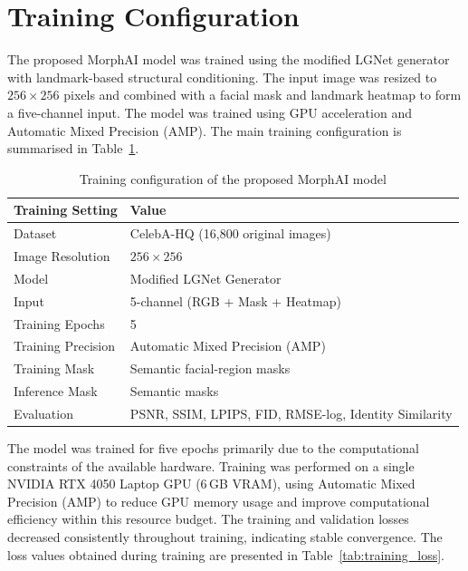 \section{Training Configuration}
The proposed MorphAI model was trained using the modified LGNet generator
with landmark-based structural conditioning. The input image was resized
to $256 \times 256$ pixels and combined with a facial mask and landmark
heatmap to form a five-channel input. The model was trained using GPU
acceleration and Automatic Mixed Precision (AMP). The main training
configuration is summarised in Table~\ref{tab:training_config}.
\begin{table}[H]
\centering
\renewcommand{\arraystretch}{1.3}
\begin{tabular}{|l|l|}
\hline
\textbf{Training Setting} & \textbf{Value} \\ \hline
Dataset & CelebA-HQ (16,800 original images) \\ \hline
Image Resolution & $256 \times 256$ \\ \hline
Model & Modified LGNet Generator \\ \hline
Input & 5-channel (RGB + Mask + Heatmap) \\ \hline
Training Epochs & 5 \\ \hline
Training Precision & Automatic Mixed Precision (AMP) \\ \hline
Training Mask & Semantic facial-region masks \\ \hline
Inference Mask & Semantic masks \\ \hline
Evaluation & PSNR, SSIM, LPIPS, FID, RMSE-log, Identity Similarity \\ \hline
\end{tabular}
\caption{Training configuration of the proposed MorphAI model}
\label{tab:training_config}
\end{table}

\noindent The model was trained for five epochs primarily due to the
computational constraints of the available hardware. Training was
performed on a single NVIDIA RTX 4050 Laptop GPU (6\,GB VRAM), using
Automatic Mixed Precision (AMP) to reduce GPU memory usage and improve
computational efficiency within this resource budget. The training and
validation losses decreased consistently throughout training, indicating
stable convergence. The loss values obtained during training are
presented in Table~\ref{tab:training_loss}.

